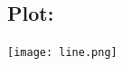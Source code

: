 \documentclass[10pt,a4paper]{report}
\begin{document}
\begin{multicols}{2}
 \section{Plot:}
 	\begin{center}
  \texttt{[image: line.png]}
  	\end{center}
  


  



\vspace{3cm}

\end{multicols}
\end{document}

